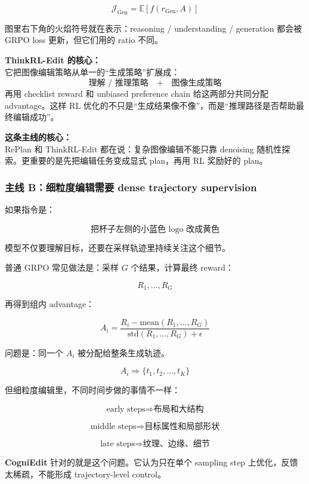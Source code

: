 \[
\mathcal{J}_\text{Gen}
=
\mathbb{E}
\left[
f(r_\text{Gen},A)
\right]
\]

图里右下角的火焰符号就在表示：reasoning / understanding / generation 都会被 GRPO loss 更新，但它们用的 ratio 不同。

\begin{summarybox}
\textbf{ThinkRL-Edit 的核心：}\\
它把图像编辑策略从单一的“生成策略”扩展成：
\[
\text{理解 / 推理策略}
\quad
+
\quad
\text{图像生成策略}
\]
再用 checklist reward 和 unbiased preference chain 给这两部分共同分配 advantage。这样 RL 优化的不只是“生成结果像不像”，而是“推理路径是否帮助最终编辑成功”。
\end{summarybox}

\begin{summarybox}
\textbf{这条主线的核心：}\\
RePlan 和 ThinkRL-Edit 都在说：复杂图像编辑不能只靠 denoising 随机性探索。更重要的是先把编辑任务变成显式 plan，再用 RL 奖励好的 plan。
\end{summarybox}

\subsubsection{主线 B：细粒度编辑需要 dense trajectory supervision}

如果指令是：

\[
\text{把杯子左侧的小蓝色 logo 改成黄色}
\]

模型不仅要理解目标，还要在采样轨迹里持续关注这个细节。

普通 GRPO 常见做法是：采样 $G$ 个结果，计算最终 reward：

\[
R_1,\ldots,R_G
\]

再得到组内 advantage：

\[
A_i
=
\frac{
R_i-\text{mean}(R_1,\ldots,R_G)
}{
\text{std}(R_1,\ldots,R_G)+\epsilon
}
\]

问题是：同一个 $A_i$ 被分配给整条生成轨迹。

\[
A_i
\Rightarrow
\{t_1,t_2,\ldots,t_K\}
\]

但细粒度编辑里，不同时间步做的事情不一样：

\[
\text{early steps}
\Rightarrow
\text{布局和大结构}
\]

\[
\text{middle steps}
\Rightarrow
\text{目标属性和局部形状}
\]

\[
\text{late steps}
\Rightarrow
\text{纹理、边缘、细节}
\]

\textbf{CogniEdit} 针对的就是这个问题。它认为只在单个 sampling step 上优化，反馈太稀疏，不能形成 trajectory-level control。

